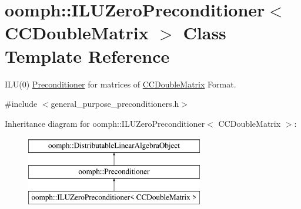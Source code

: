 \hypertarget{classoomph_1_1ILUZeroPreconditioner_3_01CCDoubleMatrix_01_4}{}\section{oomph\+:\+:I\+L\+U\+Zero\+Preconditioner$<$ C\+C\+Double\+Matrix $>$ Class Template Reference}
\label{classoomph_1_1ILUZeroPreconditioner_3_01CCDoubleMatrix_01_4}


I\+L\+U(0) \hyperlink{classoomph_1_1Preconditioner}{Preconditioner} for matrices of \hyperlink{classoomph_1_1CCDoubleMatrix}{C\+C\+Double\+Matrix} Format.  




{\ttfamily \#include $<$general\+\_\+purpose\+\_\+preconditioners.\+h$>$}

Inheritance diagram for oomph\+:\+:I\+L\+U\+Zero\+Preconditioner$<$ C\+C\+Double\+Matrix $>$\+:\begin{figure}[H]
\begin{center}
\leavevmode
\includegraphics[height=3.000000cm]{classoomph_1_1ILUZeroPreconditioner_3_01CCDoubleMatrix_01_4}
\end{center}
\end{figure}
